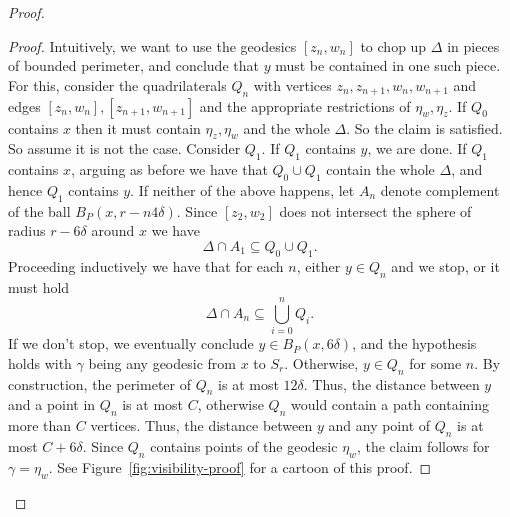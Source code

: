 \documentclass[10pt,a4paper]{amsart}
\begin{document}
\begin{proof}
\begin{proof}
    Intuitively, we want to use the geodesics $[z_n, w_n]$ to chop up  $\Delta$ in pieces of bounded perimeter, and conclude that $y$ must be contained in one such piece. For this, consider the quadrilaterals $Q_n$ with vertices $z_n, z_{n+1}, w_n, w_{n+1}$ and edges $[z_n, w_n], [z_{n+1},w_{n+1}]$ and the appropriate restrictions of $\eta_w, \eta_z$. If $Q_0$ contains $x$ then it must contain $\eta_z, \eta_w$ and the whole $\Delta$. So the claim is satisfied. So assume it is not the case. Consider $Q_1$. If $Q_1$ contains $y$, we are done. If $Q_1$ contains $x$, arguing as before we have that $Q_0 \cup Q_1$ contain the whole $\Delta$, and hence $Q_1$ contains $y$. If neither of the above happens, let $A_{n}$ denote complement of the ball $B_P(x, r-n4\delta)$. Since $[z_2, w_2]$ does not intersect the sphere of radius $r - 6\delta$ around $x$ we have 
    \[\Delta \cap  A_1 \subseteq Q_0 \cup Q_1.\]
    Proceeding inductively we have that for each $n$, either $y\in Q_n$ and we stop, or it must hold \[\Delta \cap A_n \subseteq \bigcup_{i =0}^n Q_i.\]
		If we don't stop, we eventually conclude $y \in B_P(x, 6\delta)$, and the hypothesis holds with $\gamma$ being any geodesic from $x$ to $S_r$. Otherwise, $y\in Q_n$ for some $n$. By construction, the perimeter of $Q_n$ is at most $12\delta$. Thus, the distance between $y$ and a point in $Q_n$ is at most $C$, otherwise $Q_n$ would contain a path containing more than $C$ vertices. Thus, the distance between $y$ and any point of $Q_n$ is at most $C+6\delta$. Since $Q_n$ contains points of the geodesic $\eta_w$, the claim follows for $\gamma = \eta_w$. See Figure~\ref{fig:visibility-proof} for a cartoon of this proof.
    \end{proof}

    \begin{figure}[h]
        \centering



\begin{tikzpicture}[x=0.75pt,y=0.75pt,yscale=-1,xscale=1]


\end{tikzpicture}
\end{figure}
\end{proof}
\end{document}
